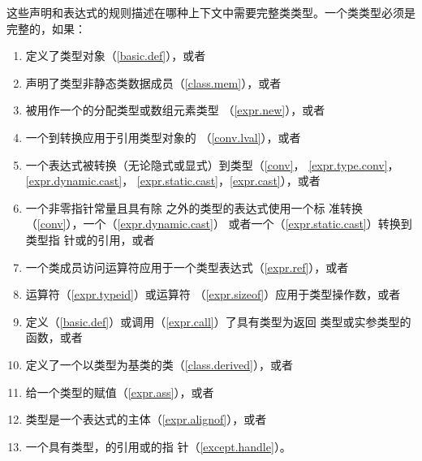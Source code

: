 \begin{note} %
  这些声明和表达式的规则描述在哪种上下文中需要完整类类型。一个类类型必须是
  完整的，如果：
  \begin{enumerate}
    \item 定义了类型对象（\ref{basic.def}），或者
    \item 声明了类型非静态类数据成员（\ref{class.mem}），或者
    \item {}被用作一个的分配类型或数组元素类型
          （\ref{expr.new}），或者
    \item 一个\lvalue{}到\rvalue{}转换应用于引用类型对象的\glvalue{}
          （\ref{conv.lval}），或者
    \item 一个表达式被转换（无论隐式或显式）到类型（\ref{conv}，
          \ref{expr.type.conv}，\ref{expr.dynamic.cast}，
          \ref{expr.static.cast}，\ref{expr.cast}），或者
    \item 一个非零指针常量且具有除 之外的类型的表达式使用一个标
          准转换（\ref{conv}），一个（\ref{expr.dynamic.cast}）
          或者一个（\ref{expr.static.cast}）转换到类型指
          针或的引用，或者
    \item 一个类成员访问运算符应用于一个类型表达式（\ref{expr.ref}），或者
    \item {}运算符（\ref{expr.typeid}）或运算符
          （\ref{expr.sizeof}）应用于类型操作数，或者
    \item 定义（\ref{basic.def}）或调用（\ref{expr.call}）了具有类型为返回
          类型或实参类型的函数，或者
    \item 定义了一个以类型为基类的类（\ref{class.derived}），或者
    \item 给一个类型的\lvalue{}赋值（\ref{expr.ass}），或者
    \item 类型是一个表达式的主体（\ref{expr.alignof}），或者
    \item 一个具有类型，的引用或的指
          针（\ref{except.handle}）。
  \end{enumerate}
\end{note}

